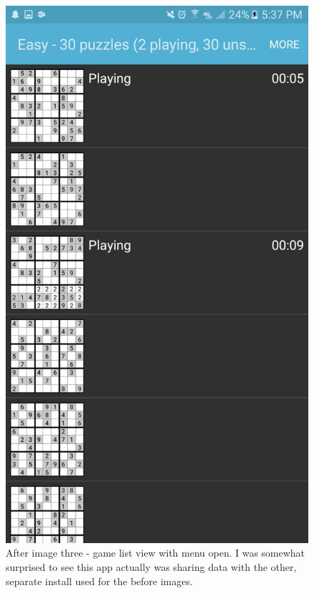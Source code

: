 \documentclass[10pt]{article}
\begin{document}
\begin{figure}
\includegraphics[width=\linewidth]{img/after3.png}
\caption{After image three - game list view with menu open. I was somewhat surprised to see this app actually was sharing data with the other, separate install used for the before images.}
\end{figure}
\end{document}
